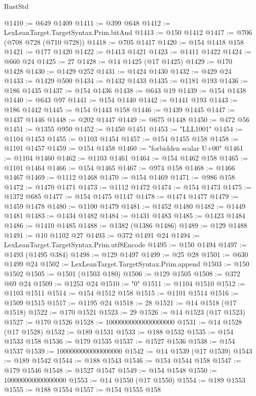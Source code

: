 \begin{lexlean}{RustStd}
\begin{coremodule}
@1410 := @649 @1409
@1411 := @399 @648
@1412 := LexLeanTarget.TargetSyntax.Prim.bitAnd
@1413 := @150 @1412
@1417 := @706 (@708 @728 (@710 @728))
@1418 := @705 @1417
@1420 := @154 @1418 @158
@1421 := @177 @1420
@1422 := @1413 @1421
@1423 := @1411 @1422
@1424 := @660 @24
@1425 := 27
@1428 := @14 @1425 (@17 @1425)
@1429 := @170 @1428
@1430 := @1429 @252
@1431 := @1424 @1430
@1432 := @429 @24
@1433 := @1429 @500
@1434 := @1432 @1433
@1435 := @1181 @193
@1436 := @186 @1435
@1437 := @154 @1436
@1438 := @643 @19
@1439 := @154 @1438
@1440 := @643 @97
@1441 := @154 @1440
@1442 := @1441 @193
@1443 := @186 @1442
@1445 := @154 @1443 @158
@1446 := @1439 @1445
@1447 := @1437 @1446
@1448 := @202 @1447
@1449 := @675 @1448
@1450 := @472 @56
@1451 := @1355 @950
@1452 := @1450 @1451
@1453 := "LLL1001"
@1454 := @1104 @1453
@1455 := @1103 @1454
@1457 := @154 @1455 @158
@1458 := @1101 @1457
@1459 := @154 @1458
@1460 := "forbidden scalar U+00"
@1461 := @1104 @1460
@1462 := @1103 @1461
@1464 := @154 @1462 @158
@1465 := @1101 @1464
@1466 := @154 @1465
@1467 := @974 @158
@1468 := @1466 @1467
@1469 := @1112 @1468
@1470 := @154 @1469
@1471 := @986 @158
@1472 := @1470 @1471
@1473 := @1112 @1472
@1474 := @154 @1473
@1475 := @1372 @685
@1477 := @154 @1475 @1147
@1478 := @1474 @1477
@1479 := @1459 @1478
@1480 := @1100 @1479
@1481 := @1452 @1480
@1482 := @1449 @1481
@1483 := @1434 @1482
@1484 := @1431 @1483
@1485 := @1423 @1484
@1486 := @1410 @1485
@1488 := @1382 (@1386 @1486)
@1489 := @129 @1488
@1491 := @10 @1102 @27
@1493 := @372 @1491 @24
@1494 := LexLeanTarget.TargetSyntax.Prim.utf8Encode
@1495 := @150 @1494
@1497 := @1493 (@1495 @384)
@1498 := @129 @1497
@1499 := @25 @28
@1501 := @630 @1499 @24
@1502 := LexLeanTarget.TargetSyntax.Prim.append
@1503 := @150 @1502
@1505 := @1501 (@1503 @180)
@1506 := @129 @1505
@1508 := @372 @69 @24
@1509 := @1253 @24
@1510 := "0"
@1511 := @1104 @1510
@1512 := @1103 @1511
@1514 := @154 @1512 @158
@1515 := @1101 @1514
@1516 := @1509 @1515
@1517 := @1195 @24
@1518 := 28
@1521 := @14 @1518 (@17 @1518)
@1522 := @170 @1521
@1523 := 29
@1526 := @14 @1523 (@17 @1523)
@1527 := @170 @1526
@1528 := 10000000000000000000
@1531 := @14 @1528 (@17 @1528)
@1532 := @189 @1531
@1533 := @188 @1532
@1535 := @154 @1533 @158
@1536 := @179 @1535
@1537 := @1527 @1536
@1538 := @154 @1537
@1539 := 1000000000000000000
@1542 := @14 @1539 (@17 @1539)
@1543 := @189 @1542
@1544 := @188 @1543
@1546 := @154 @1544 @158
@1547 := @179 @1546
@1548 := @1527 @1547
@1549 := @154 @1548
@1550 := 100000000000000000
@1553 := @14 @1550 (@17 @1550)
@1554 := @189 @1553
@1555 := @188 @1554
@1557 := @154 @1555 @158

\end{coremodule}
\end{lexlean}
